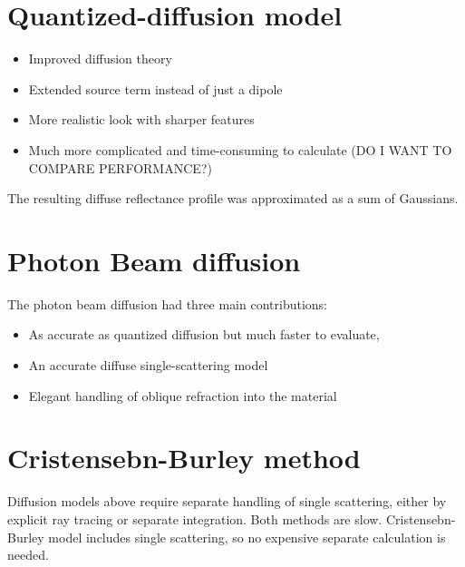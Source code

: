 \section{Quantized-diffusion model \cite{D'Eon:2011:QMR:1964921.1964951}}
\begin{itemize}
\item Improved diffusion theory
\item Extended source term instead of just a dipole
\item More realistic look with sharper features
\item Much more complicated and time-consuming to calculate (DO I WANT TO COMPARE PERFORMANCE?)
\end{itemize}
The resulting diffuse reflectance profile was approximated as a sum of Gaussians.

\section{Photon Beam diffusion \cite{Habel:2013:PBD:2600890.2600896}}
The photon beam diffusion had three main contributions:
\begin{itemize}
\item As accurate as quantized diffusion but much faster to evaluate,
\item An accurate diffuse single-scattering model
\item Elegant handling of oblique refraction into the material
\end{itemize}

\section{Cristensebn-Burley method \cite{Christensen:2015:ARP:2775280.2792555}}
Diffusion models above require separate handling of single scattering, either by explicit ray tracing or separate integration.
Both methods are slow. Cristensebn-Burley model includes single scattering, so no
expensive separate calculation is needed.